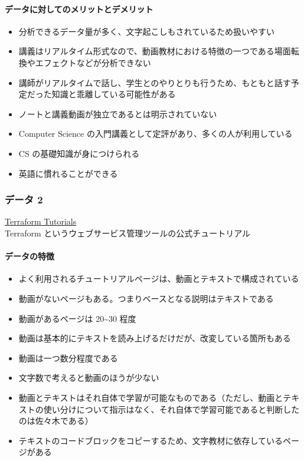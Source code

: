 \hypertarget{ux30c7ux30fcux30bfux306bux5bfeux3057ux3066ux306eux30e1ux30eaux30c3ux30c8ux3068ux30c7ux30e1ux30eaux30c3ux30c8-6}{%
\paragraph{データに対してのメリットとデメリット}\label{ux30c7ux30fcux30bfux306bux5bfeux3057ux3066ux306eux30e1ux30eaux30c3ux30c8ux3068ux30c7ux30e1ux30eaux30c3ux30c8-6}}

\begin{itemize}
\tightlist
\item
  分析できるデータ量が多く、文字起こしもされているため扱いやすい
\item
  講義はリアルタイム形式なので、動画教材における特徴の一つである場面転換やエフェクトなどが分析できない
\item
  講師がリアルタイムで話し、学生とのやりとりも行うため、もともと話す予定だった知識と乖離している可能性がある
\item
  ノートと講義動画が独立であるとは明示されていない
\item
  Computer Science の入門講義として定評があり、多くの人が利用している
\item
  CS の基礎知識が身につけられる
\item
  英語に慣れることができる
\end{itemize}

\hypertarget{ux30c7ux30fcux30bf-2-2}{%
\subsubsection{データ 2}\label{ux30c7ux30fcux30bf-2-2}}

\href{https://developer.hashicorp.com/terraform/tutorials}{Terraform
Tutorials}\\
Terraform というウェブサービス管理ツールの公式チュートリアル

\hypertarget{ux30c7ux30fcux30bfux306eux7279ux5fb4-7}{%
\paragraph{データの特徴}\label{ux30c7ux30fcux30bfux306eux7279ux5fb4-7}}

\begin{itemize}
\tightlist
\item
  よく利用されるチュートリアルページは、動画とテキストで構成されている
\item
  動画がないページもある。つまりベースとなる説明はテキストである
\item
  動画があるページは 20\textasciitilde30 程度
\item
  動画は基本的にテキストを読み上げるだけだが、改変している箇所もある
\item
  動画は一つ数分程度である
\item
  文字数で考えると動画のほうが少ない
\item
  動画とテキストはそれ自体で学習が可能なものである（ただし、動画とテキストの使い分けについて指示はなく、それ自体で学習可能であると判断したのは佐々木である）
\item
  テキストのコードブロックをコピーするため、文字教材に依存しているページがある
\end{itemize}

